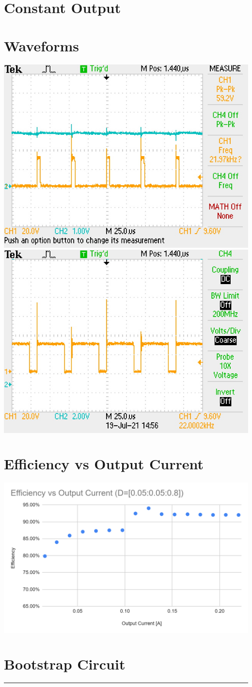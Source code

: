 \documentclass[11pt]{article}
\begin{document}
\begin{preview}
      \section{Constant Output}
      \section{Waveforms}
            \begin{center}
                  \includegraphics[height=0.2\textwidth]{img/10perc_duty_output.JPG}
                  \includegraphics[height=0.2\textwidth]{img/80perc_dut.JPG}
            \end{center}
      \section{Efficiency vs Output Current}
            \begin{center}
                  \includegraphics[height=0.3\textwidth]{img/eff.png}
            \end{center}
      \section{Bootstrap Circuit}
      \hrule
\end{preview}
\end{document}
